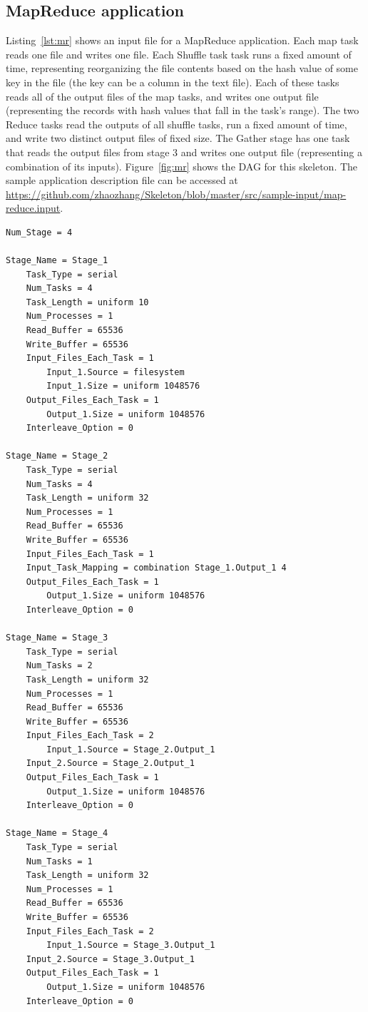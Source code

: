 \documentclass[10pt,a4paper]{article}
\begin{document}
\subsection{MapReduce application}
Listing~\ref{lst:mr} shows an input file for a MapReduce application.
Each map task reads one file and writes one file. 
Each Shuffle task task runs a fixed amount of time, representing reorganizing the file contents based on the hash value of some key in the file (the key can be a column in the text file). 
Each of these tasks reads all of the output files of the map tasks, and writes one output file (representing the records with hash values that fall in the task's range).
The two Reduce tasks read the outputs of all shuffle tasks, run a fixed amount of time, and write two distinct output files of fixed size. The Gather stage has one task that reads the output files from stage 3 and writes one output file (representing a combination of its inputs).
Figure~\ref{fig:mr} shows the DAG for this skeleton.
The sample application description file can be accessed at \url{https://github.com/zhaozhang/Skeleton/blob/master/src/sample-input/map-reduce.input}.

\begin{lstlisting}[caption=Sample input for a MapReduce application, label=lst:mr, linewidth=1.0\textwidth, xleftmargin=2.5ex]
Num_Stage = 4

Stage_Name = Stage_1
    Task_Type = serial
    Num_Tasks = 4
    Task_Length = uniform 10
    Num_Processes = 1
    Read_Buffer = 65536
    Write_Buffer = 65536
    Input_Files_Each_Task = 1
        Input_1.Source = filesystem
        Input_1.Size = uniform 1048576
    Output_Files_Each_Task = 1
        Output_1.Size = uniform 1048576
    Interleave_Option = 0

Stage_Name = Stage_2
    Task_Type = serial
    Num_Tasks = 4
    Task_Length = uniform 32
    Num_Processes = 1
    Read_Buffer = 65536
    Write_Buffer = 65536
    Input_Files_Each_Task = 1
    Input_Task_Mapping = combination Stage_1.Output_1 4
    Output_Files_Each_Task = 1
        Output_1.Size = uniform 1048576
    Interleave_Option = 0

Stage_Name = Stage_3
    Task_Type = serial
    Num_Tasks = 2
    Task_Length = uniform 32
    Num_Processes = 1
    Read_Buffer = 65536
    Write_Buffer = 65536
    Input_Files_Each_Task = 2
        Input_1.Source = Stage_2.Output_1
	Input_2.Source = Stage_2.Output_1
    Output_Files_Each_Task = 1
        Output_1.Size = uniform 1048576
    Interleave_Option = 0

Stage_Name = Stage_4
    Task_Type = serial
    Num_Tasks = 1
    Task_Length = uniform 32
    Num_Processes = 1
    Read_Buffer = 65536
    Write_Buffer = 65536
    Input_Files_Each_Task = 2
        Input_1.Source = Stage_3.Output_1
	Input_2.Source = Stage_3.Output_1
    Output_Files_Each_Task = 1
        Output_1.Size = uniform 1048576
    Interleave_Option = 0

\end{lstlisting}
\end{document}
